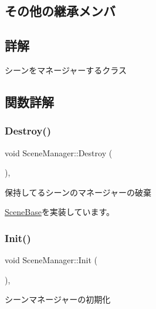 \subsection*{その他の継承メンバ}


\subsection{詳解}
シーンをマネージャーするクラス 

\subsection{関数詳解}
\mbox{\label{class_scene_manager_a0e3ad11342e763f0d4108c0b4674a157}} 
\subsubsection{\texorpdfstring{Destroy()}{Destroy()}}
{\footnotesize\ttfamily void Scene\+Manager\+::\+Destroy (\begin{DoxyParamCaption}{ }\end{DoxyParamCaption})\hspace{0.3cm}{\ttfamily [final]}, {\ttfamily [virtual]}}



保持してるシーンのマネージャーの破棄 



\mbox{\hyperlink{class_scene_base_a7c5b54020bc519b4dadfe9770d6b27f7}{Scene\+Base}}を実装しています。

\mbox{\label{class_scene_manager_a6c0e84d0e76f23fb3172839dba5f091b}} 
\subsubsection{\texorpdfstring{Init()}{Init()}}
{\footnotesize\ttfamily void Scene\+Manager\+::\+Init (\begin{DoxyParamCaption}{ }\end{DoxyParamCaption})\hspace{0.3cm}{\ttfamily [final]}, {\ttfamily [virtual]}}



シーンマネージャーの初期化 



